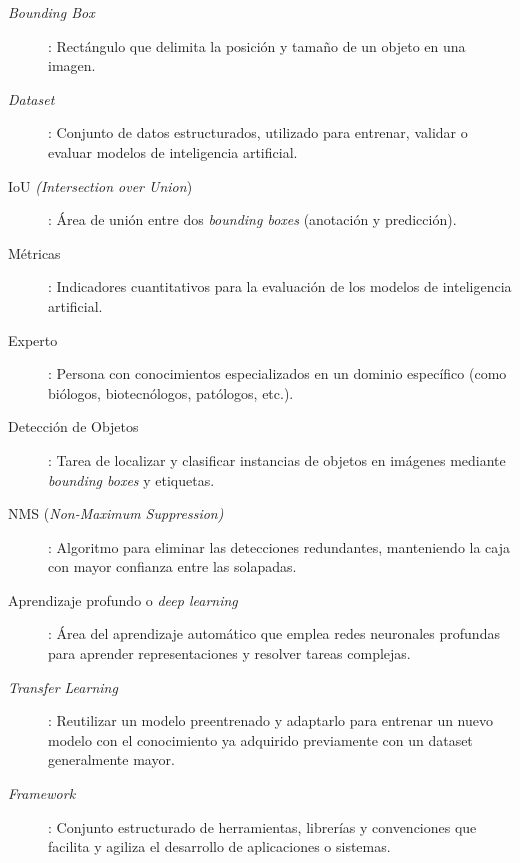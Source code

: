 \documentclass[12pt,a4paper,onecolumn,oneside]{report}
\begin{document}
\begin{description}
  \item[\textit{Bounding Box}]: Rectángulo que delimita la posición y tamaño de un objeto en una imagen.
  \item[\textit{Dataset}]: Conjunto de datos estructurados, utilizado para entrenar, validar o evaluar modelos de inteligencia artificial.
  \item[IoU \textit{(Intersection over Union})]: Área de unión entre dos \textit{bounding boxes} (anotación y predicción).
  \item[Métricas]: Indicadores cuantitativos para la evaluación de los modelos de inteligencia artificial.
  \item[Experto]: Persona con conocimientos especializados en un dominio específico (como biólogos, biotecnólogos, patólogos, etc.).
  \item[Detección de Objetos]: Tarea de localizar y clasificar instancias de objetos en imágenes mediante \textit{bounding boxes} y etiquetas.
  \item[NMS (\textit{Non-Maximum Suppression)}]: Algoritmo para eliminar las detecciones redundantes, manteniendo la caja con mayor confianza entre las solapadas.
  \item[Aprendizaje profundo o \textit{deep learning}]: Área del aprendizaje automático que emplea redes neuronales profundas para aprender representaciones y resolver tareas complejas.
  \item[\textit{Transfer Learning}]: Reutilizar un modelo preentrenado y adaptarlo para entrenar un nuevo modelo con el conocimiento ya adquirido previamente con un dataset generalmente mayor.
  \item[\textit{Framework}]: Conjunto estructurado de herramientas, librerías y convenciones que facilita y agiliza el desarrollo de aplicaciones o sistemas.

\end{description}
\end{document}
